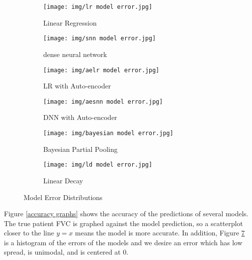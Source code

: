 \documentclass[12pt]{article}
\begin{document}
\begin{figure}[h!]
    \centering

    \begin{subfigure}{.32\textwidth}
        \centering
        \texttt{[image: img/lr model error.jpg]}
        \caption{Linear Regression}
        \label{error:lr}
    \end{subfigure}
    \begin{subfigure}{.32\textwidth}
        \centering
        \texttt{[image: img/snn model error.jpg]}
        \caption{dense neural network}
        \label{error:dnn}
    \end{subfigure}
    \begin{subfigure}{.32\textwidth}
        \centering
        \texttt{[image: img/aelr model error.jpg]}
        \caption{LR with Auto-encoder}
        \label{error:aelr}
    \end{subfigure}

    \vspace{0.5em}

    \begin{subfigure}{.32\textwidth}
        \centering
        \texttt{[image: img/aesnn model error.jpg]}
        \caption{DNN with Auto-encoder}
        \label{error:aednn}
    \end{subfigure}
    \begin{subfigure}{.32\textwidth}
        \centering
        \texttt{[image: img/bayesian model error.jpg]}
        \caption{Bayesian Partial Pooling}
        \label{error:bpp}
    \end{subfigure}
    \begin{subfigure}{.32\textwidth}
        \centering
        \texttt{[image: img/ld model error.jpg]}
        \caption{Linear Decay}
        \label{error:ld}
    \end{subfigure}

    \caption{Model Error Distributions}
    \label{error graphs}
\end{figure}

Figure \ref{accuracy graphs} shows the accuracy of the predictions of several models. 
The true patient FVC is graphed against the model prediction, so a scatterplot closer to the line $y=x$ means the model is more accurate.
In addition, Figure \ref{error graphs} is a histogram of the errors of the models and we desire an error which has low spread, is unimodal, and is centered at 0.
\end{document}
